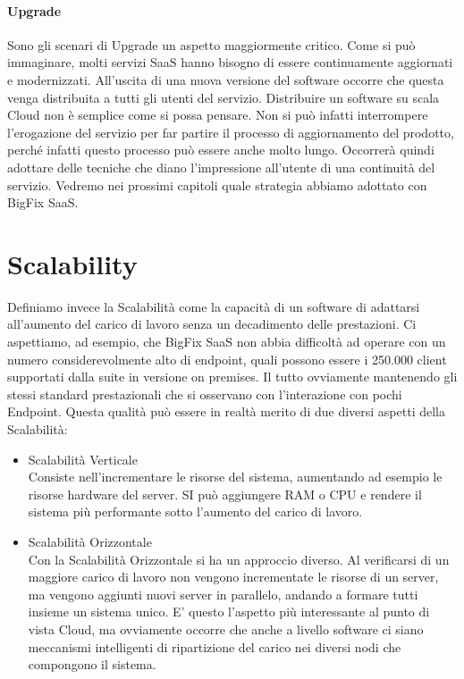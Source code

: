 \paragraph{Upgrade}
Sono gli scenari di Upgrade un aspetto maggiormente critico. Come si può immaginare, molti servizi SaaS hanno bisogno di essere continuamente aggiornati e modernizzati. All'uscita di una nuova versione del software occorre che questa venga distribuita a tutti gli utenti del servizio. Distribuire un software su scala Cloud non è semplice come si possa pensare. Non si può infatti interrompere l'erogazione del servizio per far partire il processo di aggiornamento del prodotto, perché infatti questo processo può essere anche molto lungo. Occorrerà quindi adottare delle tecniche che diano l'impressione all'utente di una continuità del servizio. Vedremo nei prossimi capitoli quale strategia abbiamo adottato con BigFix SaaS. 

\section{Scalability}
Definiamo invece la Scalabilità come la capacità di un software di adattarsi all'aumento del carico di lavoro senza un decadimento delle prestazioni. Ci aspettiamo, ad esempio, che BigFix SaaS non abbia difficoltà ad operare con un numero considerevolmente alto di endpoint, quali possono essere i 250.000 client supportati dalla suite in versione on premises. Il tutto ovviamente mantenendo gli stessi standard prestazionali che si osservano con l'interazione con pochi Endpoint. Questa qualità può essere in realtà merito di due diversi aspetti della Scalabilità:
\begin{itemize}
	\item  Scalabilità Verticale \\
	Consiste nell'incrementare le risorse del sistema, aumentando ad esempio le risorse hardware del server. SI può aggiungere RAM o CPU e rendere il sistema più performante sotto l'aumento del carico di lavoro.
	
	\item  Scalabilità Orizzontale \\
	Con la Scalabilità Orizzontale si ha un approccio diverso. Al verificarsi di un maggiore carico di lavoro non vengono incrementate le risorse di un server, ma vengono aggiunti nuovi server in parallelo, andando a formare tutti insieme un sistema unico. E' questo l'aspetto più interessante al punto di vista Cloud, ma ovviamente occorre che anche a livello software ci siano meccanismi intelligenti di ripartizione del carico nei diversi nodi che  compongono il sistema.
\end{itemize}

